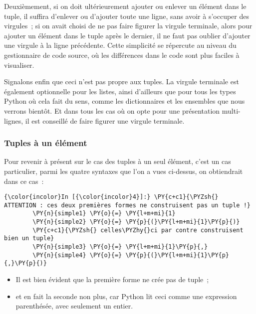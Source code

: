 Deuxièmement, si on doit ultérieurement ajouter ou enlever un élément
dans le tuple, il suffira d'enlever ou d'ajouter toute une ligne, sans
avoir à s'occuper des virgules~; si on avait choisi de ne pas faire
figurer la virgule terminale, alors pour ajouter un élément dans le
tuple après le dernier, il ne faut pas oublier d'ajouter une virgule à
la ligne précédente. Cette simplicité se répercute au niveau du
gestionnaire de code source, où les différences dans le code sont plus
faciles à visualiser.

Signalons enfin que ceci n'est pas propre aux tuples. La virgule
terminale est également optionnelle pour les listes, ainsi d'ailleurs
que pour tous les types Python où cela fait du sens, comme les
dictionnaires et les ensembles que nous verrons bientôt. Et dans tous
les cas où on opte pour une présentation multi-lignes, il est conseillé
de faire figurer une virgule terminale.

    \hypertarget{tuples-uxe0-un-uxe9luxe9ment}{%
\subsubsection{Tuples à un élément}\label{tuples-uxe0-un-uxe9luxe9ment}}

    Pour revenir à présent sur le cas des tuples à un seul élément, c'est un
cas particulier, parmi les quatre syntaxes que l'on a vues ci-dessus, on
obtiendrait dans ce cas~:

    \begin{Verbatim}[commandchars=\\\{\}]
{\color{incolor}In [{\color{incolor}4}]:} \PY{c+c1}{\PYZsh{} ATTENTION : ces deux premières formes ne construisent pas un tuple !}
        \PY{n}{simple1} \PY{o}{=} \PY{l+m+mi}{1}
        \PY{n}{simple2} \PY{o}{=} \PY{p}{(}\PY{l+m+mi}{1}\PY{p}{)}
        \PY{c+c1}{\PYZsh{} celles\PYZhy{}ci par contre construisent bien un tuple}
        \PY{n}{simple3} \PY{o}{=} \PY{l+m+mi}{1}\PY{p}{,}
        \PY{n}{simple4} \PY{o}{=} \PY{p}{(}\PY{l+m+mi}{1}\PY{p}{,}\PY{p}{)}
\end{Verbatim}


    \begin{itemize}
\tightlist
\item
  Il est bien évident que la première forme ne crée pas de tuple~;
\item
  et en fait la seconde non plus, car Python lit ceci comme une
  expression parenthésée, avec seulement un entier.
\end{itemize}

